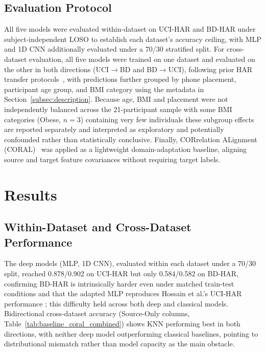 \documentclass[conference]{IEEEtran}
\begin{document}
\subsection{Evaluation Protocol}
\label{subsec:evalprotocol}
All five models were evaluated within-dataset on UCI-HAR and BD-HAR
under subject-independent LOSO to establish each dataset's accuracy
ceiling, with MLP and 1D CNN additionally evaluated under a 70/30
stratified split. For cross-dataset evaluation, all five models were
trained on one dataset and evaluated on the other in both directions
(UCI$\rightarrow$BD and BD$\rightarrow$UCI), following prior HAR
transfer protocols~\cite{hong_crosshar_2024,kasim_cross_domain_2023},
with predictions further grouped by phone placement, participant age
group, and BMI category using the metadata in
Section~\ref{subsec:description}. Because age, BMI and placement were
not independently balanced across the 21-participant sample with
some BMI categories (Obese, $n=3$) containing very few individuals
these subgroup effects are reported separately and interpreted as
exploratory and potentially confounded rather than statistically
conclusive.
Finally, CORrelation ALignment (CORAL)~\cite{sun_return_2016} was
applied as a lightweight domain-adaptation baseline, aligning source
and target feature covariances without requiring target labels.

\section{Results}
\label{sec:results}

\subsection{Within-Dataset and Cross-Dataset Performance}
The deep models (MLP, 1D CNN), evaluated within each dataset under a
70/30 split, reached 0.878/0.902 on UCI-HAR but only 0.584/0.582 on
BD-HAR, confirming BD-HAR is intrinsically harder even under matched
train-test conditions and that the adapted MLP reproduces Hossain et
al.'s UCI-HAR performance \cite{hossain_enhanced_2024}; this
difficulty held across both deep and classical models. Bidirectional
cross-dataset accuracy (Source-Only columns,
Table~\ref{tab:baseline_coral_combined}) shows KNN performing best in
both directions, with neither deep model outperforming classical
baselines, pointing to distributional mismatch rather than model
capacity as the main obstacle.
\end{document}
